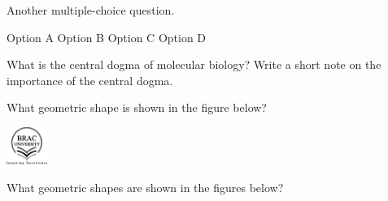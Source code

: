 \documentclass[12pt]{exam}
\begin{document}
\begin{questions}
\setcounter{question}{\lastquestionnumber} %
\addtocounter{question}{0} %

\question[4] Another multiple-choice question. 
  \begin{oneparchoices}
    \choice Option A
    \choice Option B
    \choice Option C
    \choice Option D
  \end{oneparchoices}

\question[2+4] What is the central dogma of molecular biology? Write a short note on the importance of the central dogma.  %

\question[2] What geometric shape is shown in the figure below?
\begin{center}
    \includegraphics[width=0.1\textwidth]{bracu_logo_ai.pdf}
\end{center}

\question[3] What geometric shapes are shown in the figures below?


\end{questions}
\end{document}
